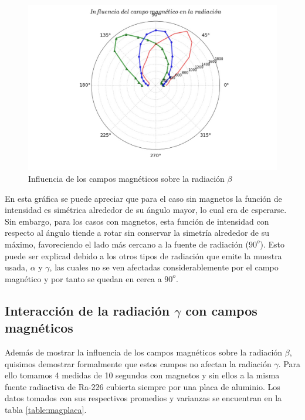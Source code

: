 \documentclass[%
 reprint,
 amsmath,amssymb,
 aps,
]{revtex4-1}
\begin{document}
\begin{figure}[h!]
\centering
\includegraphics[width=1.1\linewidth]{magneto.jpg}
\caption{Influencia de los campos magnéticos sobre la radiación $\beta$}
\label{fig:magneto}
\end{figure}

En esta gráfica se puede apreciar que para el caso sin magnetos la función de intensidad es simétrica alrededor de su ángulo mayor, lo cual era de esperarse. Sin embargo, para los casos con magnetos, esta función de intensidad con respecto al ángulo tiende a rotar sin conservar la simetría alrededor de su máximo, favoreciendo el lado más cercano a la fuente de radiación ($90^o$). Esto puede ser explicad debido a los otros tipos de radiación que emite la muestra usada, $\alpha$ y $\gamma$, las cuales no se ven afectadas considerablemente por el campo magnético y por tanto se quedan en cerca a $90^o$. \\

\subsection{\label{sec:level2}Interacción de la radiación $\gamma$ con campos magnéticos}
Además de mostrar la influencia de los campos magnéticos sobre la radiación $\beta$, quisimos demostrar formalmente que estos campos no afectan la radiación $\gamma$. Para ello tomamos 4 medidas de 10 segundos con magnetos y sin ellos a la misma fuente radiactiva de Ra-226 cubierta siempre por una placa de aluminio. Los datos tomados con sus respectivos promedios y varianzas se encuentran en la tabla \ref{table:magplaca}.\\
\end{document}
